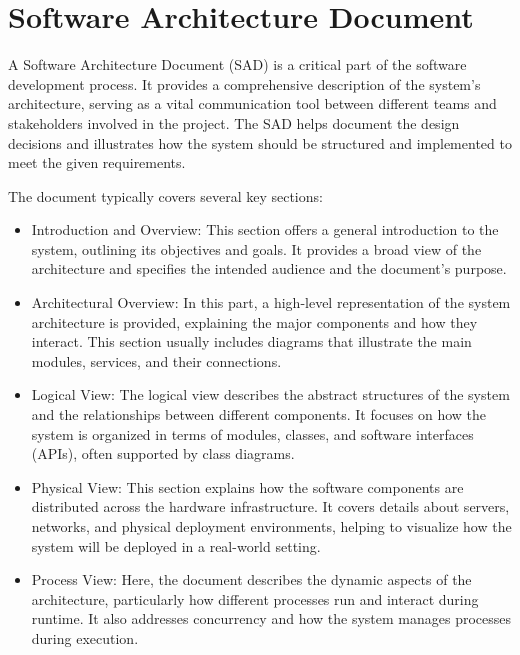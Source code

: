 \documentclass[a4paper, 10pt]{book}
\begin{document}
        \section{Software Architecture Document}

            A Software Architecture Document (SAD) is a critical part of the software development process. It provides a comprehensive description of the system’s architecture, serving as a vital communication tool between different teams and stakeholders involved in the project. The SAD helps document the design decisions and illustrates how the system should be structured and implemented to meet the given requirements.

            The document typically covers several key sections:

            \begin{itemize}
                
                \item {\bold Introduction and Overview:} This section offers a general introduction to the system, outlining its objectives and goals. It provides a broad view of the architecture and specifies the intended audience and the document’s purpose.

                \item {\bold Architectural Overview:} In this part, a high-level representation of the system architecture is provided, explaining the major components and how they interact. This section usually includes diagrams that illustrate the main modules, services, and their connections.

                \item {\bold Logical View:} The logical view describes the abstract structures of the system and the relationships between different components. It focuses on how the system is organized in terms of modules, classes, and software interfaces (APIs), often supported by class diagrams.

                \item {\bold Physical View:} This section explains how the software components are distributed across the hardware infrastructure. It covers details about servers, networks, and physical deployment environments, helping to visualize how the system will be deployed in a real-world setting.

                \item {\bold Process View:} Here, the document describes the dynamic aspects of the architecture, particularly how different processes run and interact during runtime. It also addresses concurrency and how the system manages processes during execution.


\end{itemize}
\end{document}
